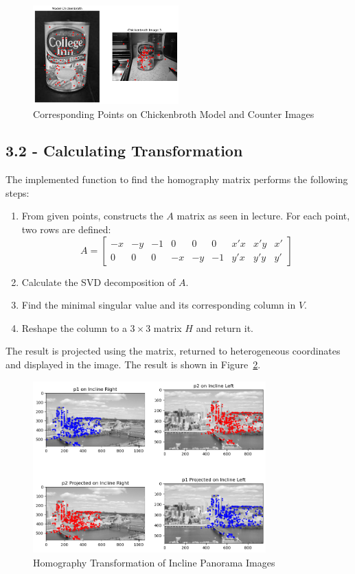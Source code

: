 \documentclass{article}
\begin{document}
\begin{figure}[h!]
    \centering
    \includegraphics[width=0.5\textwidth]{../output/3.1_cb.png}
    \caption{Corresponding Points on Chickenbroth Model and Counter Images}
    \label{fig:3_1}
\end{figure}

\subsection*{3.2 - Calculating Transformation}

The implemented function to find the homography matrix performs the following steps:
\begin{enumerate}
    \item From given points, constructs the $A$ matrix as seen in lecture. For each point, two rows are defined:
    \[ A = 
    \begin{bmatrix}
        -x & -y & -1 & 0 & 0 & 0 & x'x & x'y & x' \\
        0 & 0 & 0 & -x & -y & -1 & y'x & y'y & y'
    \end{bmatrix}
    \]
    \item Calculate the SVD decomposition of $A$.
    \item Find the minimal singular value and its corresponding column in $V$.
    \item Reshape the column to a $3 \times 3$ matrix $H$ and return it.
\end{enumerate}

The result is projected using the matrix, returned to heterogeneous coordinates and displayed in the image. The result is shown in Figure~\ref{fig:3_2}.

\begin{figure}[h!]
    \centering
    \includegraphics[width=0.8\textwidth]{../output/3.2_incline.png}
    \caption{Homography Transformation of Incline Panorama Images}
    \label{fig:3_2}
\end{figure}
\end{document}
